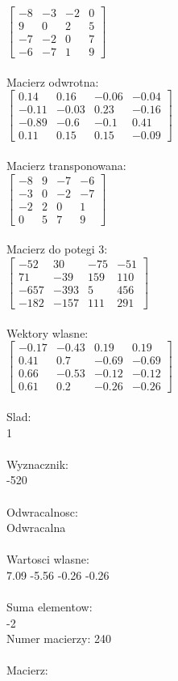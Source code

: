 \documentclass[a4paper,12pt]{article}
\begin{document}
$\begin{bmatrix} -8&-3&-2&0\\9&0&2&5\\-7&-2&0&7\\-6&-7&1&9 \end{bmatrix}$
\\
\\
Macierz odwrotna:\\

$\begin{bmatrix} 0.14&0.16&-0.06&-0.04\\-0.11&-0.03&0.23&-0.16\\-0.89&-0.6&-0.1&0.41\\0.11&0.15&0.15&-0.09 \end{bmatrix}$
\\
\\
Macierz transponowana:\\

$\begin{bmatrix} -8&9&-7&-6\\-3&0&-2&-7\\-2&2&0&1\\0&5&7&9 \end{bmatrix}$
\\
\\
Macierz do potegi 3:\\

$\begin{bmatrix} -52&30&-75&-51\\71&-39&159&110\\-657&-393&5&456\\-182&-157&111&291 \end{bmatrix}$
\\
\\
Wektory wlasne:\\

$\begin{bmatrix} -0.17&-0.43&0.19&0.19\\0.41&0.7&-0.69&-0.69\\0.66&-0.53&-0.12&-0.12\\0.61&0.2&-0.26&-0.26 \end{bmatrix}$
\\
\\
Slad:\\
1
\\
\\
Wyznacznik:\\
-520
\\
\\
Odwracalnosc:\\
Odwracalna
\\
\\
Wartosci wlasne:\\
7.09 -5.56 -0.26 -0.26
\\
\\
Suma elementow:\\
-2
\\
\newpage
Numer macierzy:
240
\\
\\
Macierz:\\
\end{document}
